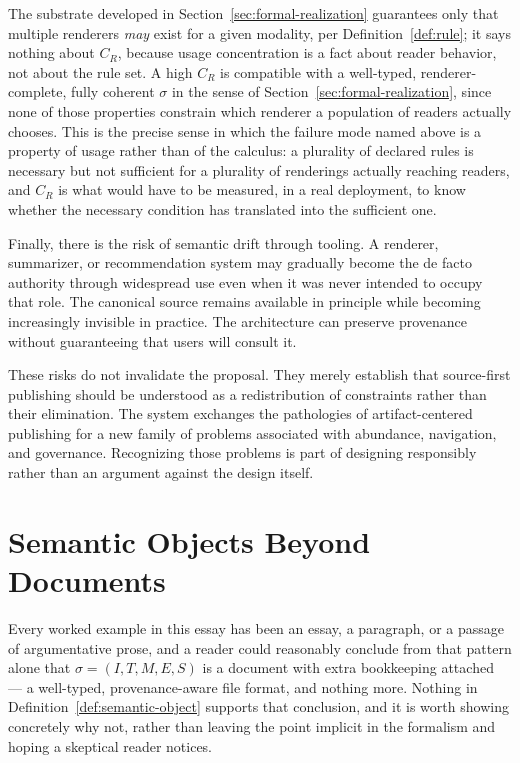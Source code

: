 \documentclass[11pt]{article}
\theoremstyle{definition}
\begin{document}
The substrate developed in Section~\ref{sec:formal-realization} guarantees only that multiple renderers \emph{may} exist for a given modality, per Definition~\ref{def:rule}; it says nothing about $C_R$, because usage concentration is a fact about reader behavior, not about the rule set. A high $C_R$ is compatible with a well-typed, renderer-complete, fully coherent $\sigma$ in the sense of Section~\ref{sec:formal-realization}, since none of those properties constrain which renderer a population of readers actually chooses. This is the precise sense in which the failure mode named above is a property of usage rather than of the calculus: a plurality of declared rules is necessary but not sufficient for a plurality of renderings actually reaching readers, and $C_R$ is what would have to be measured, in a real deployment, to know whether the necessary condition has translated into the sufficient one.

Finally, there is the risk of semantic drift through tooling. A renderer, summarizer, or recommendation system may gradually become the de facto authority through widespread use even when it was never intended to occupy that role. The canonical source remains available in principle while becoming increasingly invisible in practice. The architecture can preserve provenance without guaranteeing that users will consult it.

These risks do not invalidate the proposal. They merely establish that source-first publishing should be understood as a redistribution of constraints rather than their elimination. The system exchanges the pathologies of artifact-centered publishing for a new family of problems associated with abundance, navigation, and governance. Recognizing those problems is part of designing responsibly rather than an argument against the design itself.

\section{Semantic Objects Beyond Documents}
\label{sec:semantic-objects}

Every worked example in this essay has been an essay, a paragraph, or a passage of argumentative prose, and a reader could reasonably conclude from that pattern alone that $\sigma = (I,T,M,E,S)$ is a document with extra bookkeeping attached --- a well-typed, provenance-aware file format, and nothing more. Nothing in Definition~\ref{def:semantic-object} supports that conclusion, and it is worth showing concretely why not, rather than leaving the point implicit in the formalism and hoping a skeptical reader notices.
\end{document}
